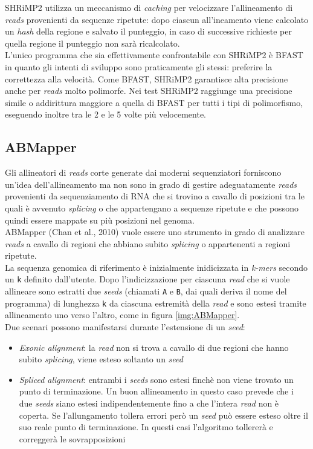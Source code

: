 \documentclass[conference]{IEEEtran}
\begin{document}
SHRiMP2 utilizza un meccanismo di \textit{caching} per velocizzare l'allineamento di \textit{reads} provenienti da sequenze ripetute: dopo ciascun all'ineamento viene calcolato un \textit{hash} della regione e salvato il punteggio, in caso di successive richieste per quella regione il punteggio non sarà ricalcolato.\\

L'unico programma che sia effettivamente confrontabile con SHRiMP2 è BFAST in quanto gli intenti di sviluppo sono praticamente gli stessi: preferire la correttezza alla velocità. Come BFAST, SHRiMP2 garantisce alta precisione anche per \textit{reads} molto polimorfe. Nei test SHRiMP2 raggiunge una precisione simile o addirittura maggiore a quella di BFAST per tutti i tipi di polimorfismo, eseguendo inoltre tra le 2 e le 5 volte più velocemente.

	\subsection{ABMapper}
	Gli allineatori di \textit{reads} corte generate dai moderni sequenziatori forniscono un'idea dell'allineamento ma non sono in grado di gestire adeguatamente \textit{reads} provenienti da sequenziamento di RNA che si trovino a cavallo di posizioni tra le quali è avvenuto \textit{splicing} o che appartengano a sequenze ripetute e che possono quindi essere mappate su più posizioni nel genoma.\\

ABMapper (Chan et al., 2010) vuole essere uno strumento in grado di analizzare \textit{reads} a cavallo di regioni che abbiano subito \textit{splicing} o appartenenti a regioni ripetute.\\

La sequenza genomica di riferimento è inizialmente inidicizzata in \textit{k-mers} secondo un \texttt{k} definito dall'utente. Dopo l'indicizzazione per ciascuna \textit{read} che si vuole allineare sono estratti due \textit{seeds} (chiamati \texttt{A} e \texttt{B}, dai quali deriva il nome del programma) di lunghezza \texttt{k} da ciascuna estremità della \textit{read} e sono estesi tramite allineamento uno verso l'altro, come in figura \ref{img:ABMapper}.\\


Due scenari possono manifestarsi durante l'estensione di un \textit{seed}:
\begin{itemize}
	\item \textit{Exonic alignment}: la \textit{read} non si trova a cavallo di due regioni che hanno subito \textit{splicing}, viene esteso soltanto un \textit{seed}
	\item \textit{Spliced alignment}: entrambi i \textit{seeds} sono estesi finchè non viene trovato un punto di terminazione. Un buon allineamento in questo caso prevede che i due \textit{seeds} siano estesi indipendentemente fino a che l'intera \textit{read} non è coperta. Se l'allungamento tollera errori però un \textit{seed} può essere esteso oltre il suo reale punto di terminazione. In questi casi l'algoritmo tollererà e correggerà le sovrapposizioni\\
\end{itemize}
\end{document}

